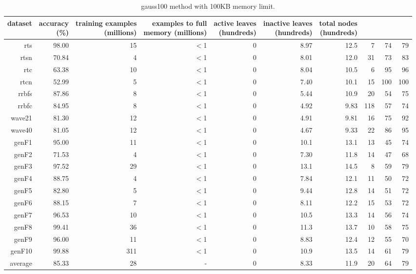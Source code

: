 \clearpage
\begin{table}
\caption{{\sc gauss100} method with 100KB memory limit.}
\label{tab:gauss100-100k}
\centering
\begin{tabular}{|r|r|r|r|r|r|r|r|r|r|}
\hline
dataset	&
\rotatebox{90}{\parbox{9em}{accuracy\\(\%)}} &
\rotatebox{90}{\parbox{9em}{training examples\\(millions)}} &
\rotatebox{90}{\parbox{9em}{examples to full\\memory (millions)}} &
\rotatebox{90}{\parbox{9em}{active leaves\\(hundreds)}} &
\rotatebox{90}{\parbox{9em}{inactive leaves\\(hundreds)}} &
\rotatebox{90}{\parbox{9em}{total nodes\\(hundreds)}} &
\rotatebox{90}{\parbox{9em}{tree depth}}	&
\rotatebox{90}{\parbox{9em}{training speed (\%)}} &
\rotatebox{90}{\parbox{9em}{prediction speed (\%)}} \\
\hline
{\sc rts} & 98.00 & 15 & $<$1 & 0 & 8.97 & 12.5 & 7 & 74 & 79 \\
{\sc rtsn} & 70.84 & 4 & $<$1 & 0 & 8.01 & 12.0 & 31 & 73 & 83 \\
{\sc rtc} & 63.38 & 10 & $<$1 & 0 & 8.04 & 10.5 & 6 & 95 & 96 \\
{\sc rtcn} & 52.99 & 5 & $<$1 & 0 & 7.40 & 10.1 & 15 & 100 & 100 \\
{\sc rrbfs} & 87.86 & 8 & $<$1 & 0 & 5.44 & 10.9 & 20 & 54 & 75 \\
{\sc rrbfc} & 84.95 & 8 & $<$1 & 0 & 4.92 & 9.83 & 118 & 57 & 74 \\
{\sc wave21} & 81.30 & 12 & $<$1 & 0 & 4.91 & 9.81 & 16 & 75 & 92 \\
{\sc wave40} & 81.05 & 12 & $<$1 & 0 & 4.67 & 9.33 & 22 & 86 & 95 \\
{\sc genF1} & 95.00 & 11 & $<$1 & 0 & 10.1 & 13.1 & 13 & 45 & 74 \\
{\sc genF2} & 71.53 & 4 & $<$1 & 0 & 7.30 & 11.8 & 14 & 47 & 68 \\
{\sc genF3} & 97.52 & 29 & $<$1 & 0 & 13.1 & 14.5 & 8 & 59 & 79 \\
{\sc genF4} & 88.75 & 4 & $<$1 & 0 & 7.84 & 12.1 & 11 & 50 & 72 \\
{\sc genF5} & 82.80 & 5 & $<$1 & 0 & 9.44 & 12.8 & 14 & 51 & 72 \\
{\sc genF6} & 88.15 & 7 & $<$1 & 0 & 8.11 & 12.2 & 15 & 53 & 72 \\
{\sc genF7} & 96.53 & 10 & $<$1 & 0 & 10.5 & 13.3 & 14 & 56 & 74 \\
{\sc genF8} & 99.41 & 36 & $<$1 & 0 & 11.3 & 13.7 & 10 & 58 & 75 \\
{\sc genF9} & 96.00 & 11 & $<$1 & 0 & 8.83 & 12.4 & 12 & 55 & 70 \\
{\sc genF10} & 99.88 & 311 & $<$1 & 0 & 10.9 & 13.5 & 14 & 61 & 79 \\
\hline
average & 85.33 & 28 &  -  & 0 & 8.33 & 11.9 & 20 & 64 & 79 \\
\hline
\end{tabular}
\end{table}
